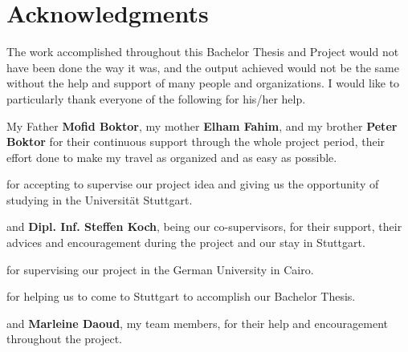 \chapter*{Acknowledgments}
\beginchapter
\par \noindent
The work accomplished throughout this Bachelor Thesis and Project would not have been done the way it was, and the output achieved would not be the same without the help and support of many people and organizations. I would like to particularly thank everyone of the following for his/her help.

\vspace{0.4cm}

\par \noindent
My Father {\bf Mofid Boktor}, my mother {\bf Elham Fahim}, and my brother {\bf Peter Boktor} for their continuous support through the whole project period, their effort done to make my travel as organized and as easy as possible.

\vspace{0.4cm}

\par {} for accepting to supervise our project idea and giving us the opportunity of studying in the Universit\"at Stuttgart.

\vspace{0.4cm}

\par {} and {\bf Dipl. Inf. Steffen Koch}, being our co-supervisors, for their support, their advices and encouragement during the project and our stay in Stuttgart.

\vspace{0.4cm}

\par {} for supervising our project in the German University in Cairo.

\vspace{0.4cm}

\par {} for helping us to come to Stuttgart to accomplish our Bachelor Thesis.

\vspace{0.4cm}

\par {} and {\bf Marleine Daoud}, my team members, for their help and encouragement throughout the project.

